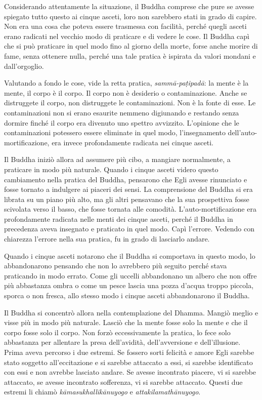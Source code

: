 Considerando attentamente la situazione, il Buddha comprese che pure se
avesse spiegato tutto questo ai cinque asceti, loro non sarebbero stati
in grado di capire. Non era una cosa che poteva essere trasmessa con
facilità, perché quegli asceti erano radicati nel vecchio modo di
praticare e di vedere le cose. Il Buddha capì che si può praticare in
quel modo fino al giorno della morte, forse anche morire di fame, senza
ottenere nulla, perché una tale pratica è ispirata da valori mondani e
dall'orgoglio.

Valutando a fondo le cose, vide la retta pratica, \emph{sammā-paṭipadā}:
la mente è la mente, il corpo è il corpo. Il corpo non è desiderio o
contaminazione. Anche se distruggete il corpo, non distruggete le
contaminazioni. Non è la fonte di esse. Le contaminazioni non si erano
esaurite nemmeno digiunando e restando senza dormire finché il corpo era
divenuto uno spettro avvizzito. L'opinione che le contaminazioni
potessero essere eliminate in quel modo, l'insegnamento
dell'auto-mortificazione, era invece profondamente radicata nei cinque
asceti.

Il Buddha iniziò allora ad assumere più cibo, a mangiare normalmente, a
praticare in modo più naturale. Quando i cinque asceti videro questo
cambiamento nella pratica del Buddha, pensarono che Egli avesse
rinunciato e fosse tornato a indulgere ai piaceri dei sensi. La
comprensione del Buddha si era librata su un piano più alto, ma gli
altri pensavano che la sua prospettiva fosse scivolata verso il basso,
che fosse tornata alle comodità. L'auto-mortificazione era profondamente
radicata nelle menti dei cinque asceti, perché il Buddha in precedenza
aveva insegnato e praticato in quel modo. Capì l'errore. Vedendo con
chiarezza l'errore nella sua pratica, fu in grado di lasciarlo andare.

Quando i cinque asceti notarono che il Buddha si comportava in questo
modo, lo abbandonarono pensando che non lo avrebbero più seguito perché
stava praticando in modo errato. Come gli uccelli abbandonano un albero
che non offre più abbastanza ombra o come un pesce lascia una pozza
d'acqua troppo piccola, sporca o non fresca, allo stesso modo i cinque
asceti abbandonarono il Buddha.

Il Buddha si concentrò allora nella contemplazione del Dhamma. Mangiò
meglio e visse più in modo più naturale. Lasciò che la mente fosse solo
la mente e che il corpo fosse solo il corpo. Non forzò eccessivamente la
pratica, lo fece solo abbastanza per allentare la presa dell'avidità,
dell'avversione e dell'illusione. Prima aveva percorso i due estremi. Se
fossero sorti felicità e amore Egli sarebbe stato soggetto
all'eccitazione e si sarebbe attaccato a essi, si sarebbe identificato
con essi e non avrebbe lasciato andare. Se avesse incontrato piacere, vi
si sarebbe attaccato, se avesse incontrato sofferenza, vi si sarebbe
attaccato. Questi due estremi li chiamò \emph{kāmasukhallikānuyogo} e
\emph{attakilamathānuyogo}.

